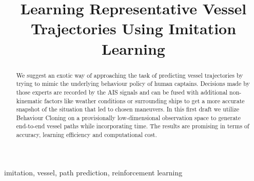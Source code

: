 \documentclass[conference]{IEEEtran}
\begin{document}
\title{Learning Representative Vessel Trajectories Using Imitation Learning\\}

\author{
}

\maketitle

\begin{abstract}
We suggest an exotic way of approaching the task of predicting vessel trajectories by trying to mimic the underlying behaviour policy of human captains. Decisions made by those experts are recorded by the AIS signals and can be fused with additional non-kinematic factors like weather conditions or surrounding ships to get a more accurate snapshot of the situation that led to chosen maneuvers. In this first draft we utilize Behaviour Cloning on a provisionally low-dimensional observation space to generate end-to-end vessel paths while incorporating time. The results are promising in terms of accuracy, learning efficiency and computational cost.
\end{abstract}

\begin{IEEEkeywords}
imitation, vessel, path prediction, reinforcement learning
\end{IEEEkeywords}
\end{document}
